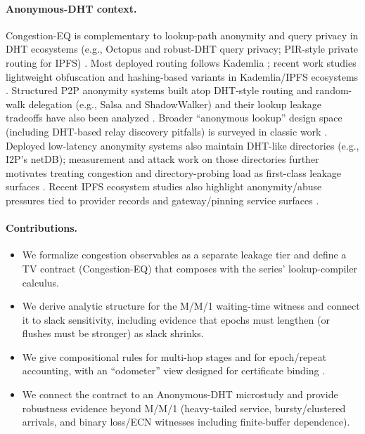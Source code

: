 \documentclass[11pt]{article}
\theoremstyle{definition}
\theoremstyle{remark}
\begin{document}
\paragraph{Anonymous-DHT context.}
Congestion-EQ is complementary to lookup-path anonymity and query privacy in DHT ecosystems (e.g., Octopus and robust-DHT query privacy; PIR-style private routing for IPFS) \cite{octopus,add_query_privacy,peer2pir}.
Most deployed routing follows Kademlia \cite{kademlia}; recent work studies lightweight obfuscation and hashing-based variants in Kademlia/IPFS ecosystems \cite{kademlia_obfuscation,ipfs_triplehash,bitswap_randomwalks}.
Structured P2P anonymity systems built atop DHT-style routing and random-walk delegation (e.g., Salsa and ShadowWalker) and their lookup leakage tradeoffs have also been analyzed \cite{salsa,shadowwalker,mittal_infoleaks2012}.
Broader ``anonymous lookup'' design space (including DHT-based relay discovery pitfalls) is surveyed in classic work \cite{morselli2006_lookup,wang_mittal_borisov2010_lookup}.
Deployed low-latency anonymity systems also maintain DHT-like directories (e.g., I2P's netDB); measurement and attack work on those directories further motivates treating congestion and directory-probing load as first-class leakage surfaces \cite{egger_i2p2013,timpanaro_netdb2015}.
Recent IPFS ecosystem studies also highlight anonymity/abuse pressures tied to provider records and gateway/pinning service surfaces \cite{ipfs_abuse2025}.

\paragraph{Contributions.}
\begin{itemize}[leftmargin=1.2em]
\item We formalize congestion observables as a separate leakage tier and define a TV contract (Congestion-EQ) that composes with the series' lookup-compiler calculus.
\item We derive analytic structure for the M/M/1 waiting-time witness and connect it to slack sensitivity, including evidence that epochs must lengthen (or flushes must be stronger) as slack shrinks.
\item We give compositional rules for multi-hop stages and for epoch/repeat accounting, with an ``odometer'' view designed for certificate binding \cite{series:wcongeq}.
\item We connect the contract to an Anonymous-DHT microstudy and provide robustness evidence beyond M/M/1 (heavy-tailed service, bursty/clustered arrivals, and binary loss/ECN witnesses including finite-buffer dependence).
\end{itemize}
\end{document}
